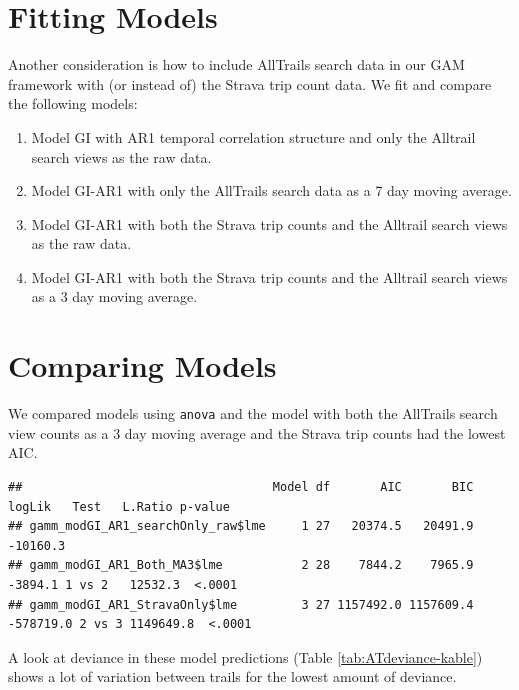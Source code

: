 \documentclass[
]{book}
\providecommand{\tightlist}{%
  \setlength{\itemsep}{0pt}\setlength{\parskip}{0pt}}
\begin{document}
\hypertarget{fitting-models}{%
\section{Fitting Models}\label{fitting-models}}

Another consideration is how to include AllTrails search data in our GAM framework with (or instead of) the Strava trip count data. We fit and compare the following models:

\begin{enumerate}
\def\labelenumi{\arabic{enumi}.}
\tightlist
\item
  Model GI with AR1 temporal correlation structure and only the Alltrail search views as the raw data.
\item
  Model GI-AR1 with only the AllTrails search data as a 7 day moving average.
\item
  Model GI-AR1 with both the Strava trip counts and the Alltrail search views as the raw data.
\item
  Model GI-AR1 with both the Strava trip counts and the Alltrail search views as a 3 day moving average.
\end{enumerate}

\hypertarget{comparing-models}{%
\section{Comparing Models}\label{comparing-models}}

We compared models using \texttt{anova} and the model with both the AllTrails search view counts as a 3 day moving average and the Strava trip counts had the lowest AIC.

\begin{verbatim}
##                                   Model df       AIC       BIC    logLik   Test   L.Ratio p-value
## gamm_modGI_AR1_searchOnly_raw$lme     1 27   20374.5   20491.9  -10160.3                         
## gamm_modGI_AR1_Both_MA3$lme           2 28    7844.2    7965.9   -3894.1 1 vs 2   12532.3  <.0001
## gamm_modGI_AR1_StravaOnly$lme         3 27 1157492.0 1157609.4 -578719.0 2 vs 3 1149649.8  <.0001
\end{verbatim}

A look at deviance in these model predictions (Table \ref{tab:ATdeviance-kable}) shows a lot of variation between trails for the lowest amount of deviance.
\end{document}
